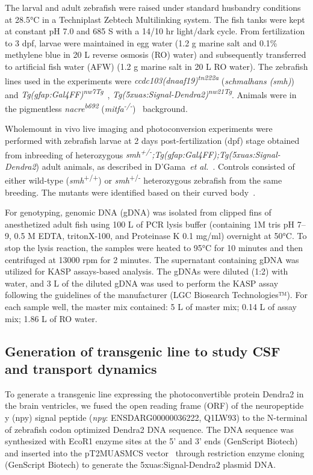 \documentclass{WileyMSP-template}
\begin{document}
The larval and adult zebrafish were raised under standard husbandry
conditions at 28.5°C in a Techniplast Zebtech Multilinking system.
The fish tanks were kept at constant pH 7.0 and 685 \textmu S with a
14/10 hr light/dark cycle.
From fertilization to 3 dpf, larvae were maintained in egg
water (1.2 g marine salt and 0.1\% methylene blue in 20 L reverse osmosis (RO) water)
and subsequently transferred to artificial fish water (AFW)
(1.2 g marine salt in 20 L RO water). The zebrafish lines used in the experiments were
\emph{ccdc103(dnaaf19)\textsuperscript{tn222a}}
(\emph{schmalhans (smh)})~\cite{Jau-NianChen1997Left-rightZebrafish}
and \emph{Tg(gfap:Gal4FF)\textsuperscript{nw7Tg}}~\cite{DiazVerdugo2019Glia-neuronSeizures},
\emph{Tg(5xuas:Signal-Dendra2)\textsuperscript{nw21Tg}}.
Animals were in the pigmentless \emph{nacre\textsuperscript{b692}}
(\emph{mitfa\textsuperscript{-/-}})~\cite{JamesA.Lister1999NacreFate} background.

Wholemount in vivo live imaging and photoconversion
experiments were performed with zebrafish larvae at 2 days post-fertilization (dpf) stage obtained from inbreeding of heterozygous
\emph{smh\textsuperscript{+/-};Tg(gfap:Gal4FF);Tg(5xuas:Signal-Dendra2})
adult animals, as described in D'Gama~\emph{et al.}~\cite{DGama2024Cilia-mediatedBrain}.
Controls consisted of either wild-type (\emph{smh}\textsuperscript{+/+})
or \emph{smh}\textsuperscript{+/-} heterozygous zebrafish from the same breeding.
The mutants were identified based on their curved body~\cite{Jau-NianChen1997Left-rightZebrafish}.

For genotyping, genomic DNA (gDNA) was isolated from clipped fins of anesthetized adult
fish using 100 \textmu L of PCR lysis buffer (containing 1M tris pH 7--9, 0.5 M EDTA,
tritonX-100, and Proteinase K 0.1 mg/ml) overnight at 50°C.
To stop the lysis reaction, the samples were heated to 95°C for 10 minutes
and then centrifuged at 13000 rpm for 2 minutes.
The supernatant containing gDNA was utilized for KASP assays-based analysis.
The gDNAs were diluted (1:2) with water, and 3 \textmu L of the diluted gDNA was
used to perform the KASP assay following the guidelines of the manufacturer (LGC Biosearch Technologies™).
For each sample well, the master mix contained: 5 \textmu L of master mix; 0.14
\textmu L of assay mix; 1.86 \textmu L of RO water.

\subsection{Generation of transgenic line to study CSF and transport dynamics} 
To generate a transgenic line expressing the photoconvertible protein Dendra2 in
the brain ventricles, we fused the open reading frame (ORF)
of the neuropeptide y (npy) signal peptide
(\emph{npy}: ENSDARG00000036222, Q1LW93) to the N-terminal of
zebrafish codon optimized Dendra2 DNA sequence.
The DNA sequence was synthesized with EcoR1 enzyme sites at the 5’ and
3’ ends (GenScript Biotech) and inserted into the
pT2MUASMCS vector~\cite{Asakawa2008GeneticZebrafish}
through restriction enzyme cloning (GenScript Biotech)
to generate the 5xuas:Signal-Dendra2 plasmid DNA.
\end{document}
